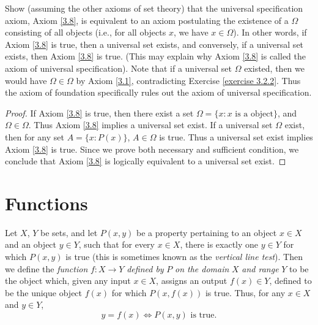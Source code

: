 \begin{exercise}\label{exercise 3.2.3}
Show (assuming the other axioms of set theory) that the universal specification axiom, Axiom \ref{3.8}, is equivalent to an axiom postulating the existence of a  \(\Omega\) consisting of all objects (i.e., for all objects \(x\), we have \(x \in \Omega\)).
In other words, if Axiom \ref{3.8} is true, then a universal set exists, and conversely, if a universal set exists, then Axiom \ref{3.8} is true.
(This may explain why Axiom \ref{3.8} is called the axiom of universal specification).
Note that if a universal set \(\Omega\) existed, then we would have \(\Omega \in \Omega\) by Axiom \ref{3.1}, contradicting Exercise \ref{exercise 3.2.2}.
Thus the axiom of foundation specifically rules out the axiom of universal specification.
\end{exercise}

\begin{proof}
If Axiom \ref{3.8} is true, then there exist a set \(\Omega = \{x: x \text{ is a object}\}\), and \(\Omega \in \Omega\).
Thus Axiom \ref{3.8} implies a universal set exist.
If a universal set \(\Omega\) exist, then for any set \(A = \{x: P(x)\}\), \(A \in \Omega\) is true.
Thus a universal set exist implies Axiom \ref{3.8} is true.
Since we prove both necessary and sufficient condition, we conclude that Axiom \ref{3.8} is logically equivalent to a universal set exist.
\end{proof}

\section{Functions}

\begin{definition}[Functions]\label{definition 3.3.1}
Let \(X\), \(Y\) be sets, and let \(P(x, y)\) be a property pertaining to an object \(x \in X\) and an object \(y \in Y\), such that for every \(x \in X\), there is exactly one \(y \in Y\) for which \(P(x, y)\) is true (this is sometimes known as the \emph{vertical line test}).
Then we define the \emph{function} \(f : X \to Y\) \emph{defined by} \(P\) \emph{on the domain} \(X\) \emph{and range} \(Y\) to be the object which, given any input \(x \in X\), assigns an output \(f(x) \in Y\), defined to be the unique object \(f(x)\) for which \(P(x, f(x))\) is true.
Thus, for any \(x \in X\) and \(y \in Y\),
\[
    y = f(x) \iff P(x, y) \text{ is true}.
\]
\end{definition}

